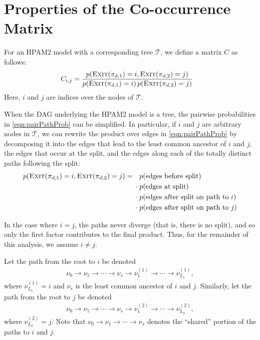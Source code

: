 \documentclass{article}
\theoremstyle{definition}
\newcommand{\Exit}{\textsc{Exit}}
\begin{document}
\section{Properties of the Co-occurrence Matrix}

For an HPAM2 model with a corresponding tree $\mathcal T$, we define a matrix $C$ as follows:
\begin{align}
C_{i,j} &= \frac{p(\Exit(\pi_{d,1}) = i, \Exit(\pi_{d,2}) = j)}
                {p(\Exit(\pi_{d,1}) = i) \, p(\Exit(\pi_{d,2}) = j)}
\end{align}
Here, $i$ and $j$ are indices over the nodes of $\mathcal T$.

When the DAG underlying the HPAM2 model is a tree, the pairwise probabilities in \eqref{eqn:pairPathProb} can be simplified.
In particular, if $i$ and $j$ are arbitrary nodes in $\mathcal T$, we can rewrite the product over edges in \eqref{eqn:pairPathProb} by decomposing it into the edges that lead to the least common ancestor of $i$ and $j$, the edges that occur at the split, and the edges along each of the totally distinct paths following the split:
\begin{align}
p(\Exit(\pi_{d,1}) = i, \Exit(\pi_{d,2}) = j)
={}&
\phantom{{}\cdot{}} p(\text{edges before split}) \\
& \cdot p(\text{edges at split}) \nonumber \\
& \cdot p(\text{edges after split on path to $i$}) \nonumber \\
& \cdot p(\text{edges after split on path to $j$}) \nonumber
\end{align}

In the case where $i = j$, the paths never diverge (that is, there is no split), and so only the first factor contributes to the final product.
Thus, for the remainder of this analysis, we assume $i \neq j$.

Let the path from the root to $i$ be denoted
\begin{align}
\nu_0 \to \nu_1 \to \cdots \to \nu_s \to \nu^{(1)}_1 \to \cdots \to \nu^{(1)}_{L_1},
\end{align}
where $\nu^{(1)}_{L_1} = i$ and $\nu_s$ is the least common ancestor of $i$ and $j$.
Similarly, let the path from the root to $j$ be denoted
\begin{align}
\nu_0 \to \nu_1 \to \cdots \to \nu_s \to \nu^{(2)}_1 \to \cdots \to \nu^{(2)}_{L_2},
\end{align}
where $\nu^{(2)}_{L_2} = j$.
Note that $\nu_0 \to \nu_1 \to \cdots \to \nu_s$ denotes the ``shared'' portion of the paths to $i$ and $j$.
\end{document}
